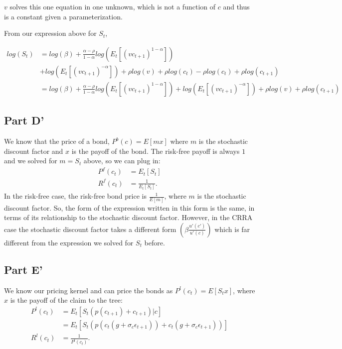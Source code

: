 \documentclass[11pt]{article} %
\begin{document}
$v$ solves this one equation in one unknown, which is not a function of $c$ and thus is a constant given a parameterization.

From our expression above for $S_t$,

\begin{align*}
log(S_t) &= log(\beta)+\frac{\alpha - \rho}{1-\alpha}log(E_t[(vc_{t+1})^{1-\alpha}]) \\
&+log(E_t[(vc_{t+1})^{-\alpha}]) + \rho log(v) + \rho log(c_t) - \rho log(c_t) + \rho log(c_{t+1})\\
&=log(\beta)+\frac{\alpha - \rho}{1-\alpha}log(E_t[(vc_{t+1})^{1-\alpha}]) +log(E_t[(vc_{t+1})^{-\alpha}]) + \rho log(v) + \rho log(c_{t+1})
\end{align*} 
\subsection{Part D'}
We know that the price of a bond, $P^b(c) = E[mx]$ where $m$ is the stochastic discount factor and $x$ is the payoff of the bond. The risk-free payoff is always $1$ and we solved for $m = S_t$ above, so we can plug in:
\begin{align*}
P^f(c_t) &= E_t[S_t] \\
R^f(c_t) &= \frac{1}{E_t[S_t]}.
\end{align*}
In the risk-free case, the risk-free bond price is $\frac{1}{E[m]}$, where $m$ is the stochastic discount factor. So, the form of the expression written in this form is the same, in terms of its relationship to the stochastic discount factor. However, in the CRRA case the stochastic discount factor takes a different form $\left( \beta\frac{u'(c')}{u'(c)} \right)$ which is far different from the expression we solved for $S_t$ before.
\subsection{Part E'}
We know our pricing kernel and can price the bonds as $P^l(c_t) = E[S_tx]$, where $x$ is the payoff of the claim to the tree:
\begin{align*}
P^l(c_t) &= E_t[S_t (p(c_{t+1}) +c_{t+1})|c] \\
&=  E_t[S_t (p(c_t(g+\sigma_c\epsilon_{t+1})) +c_t(g+\sigma_c\epsilon_{t+1}))]\\
R^l(c_t) &= \frac{1}{P^{l}(c_t)}.
\end{align*}
\end{document}
